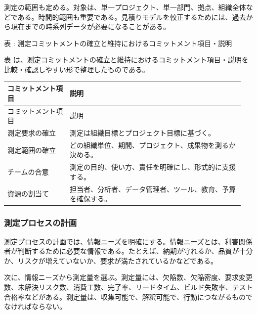 測定の範囲も定める。対象は、単一プロジェクト、単一部門、拠点、組織全体などである。時間的範囲も重要である。見積りモデルを較正するためには、過去から現在までの時系列データが必要になることがある。

\par\smallskip\noindent{}\label{tab:ch09-06}表 \thetable: 測定コミットメントの確立と維持におけるコミットメント項目・説明\par\smallskip
表 \thetable は、測定コミットメントの確立と維持におけるコミットメント項目・説明を比較・確認しやすい形で整理したものである。\par\smallskip
\begin{longtable}{>{\raggedright\arraybackslash}p{0.25\linewidth}>{\raggedright\arraybackslash}p{0.70\linewidth}}
\toprule
コミットメント項目 & 説明 \\
\midrule
\endfirsthead
\toprule
コミットメント項目 & 説明 \\
\midrule
\endhead
測定要求の確立 & 測定は組織目標とプロジェクト目標に基づく。 \\
測定範囲の確立 & どの組織単位、期間、プロジェクト、成果物を測るか決める。 \\
チームの合意 & 測定の目的、使い方、責任を明確にし、形式的に支援する。 \\
資源の割当て & 担当者、分析者、データ管理者、ツール、教育、予算を確保する。 \\
\bottomrule
\end{longtable}

\subsubsection{測定プロセスの計画}
測定プロセスの計画では、情報ニーズを明確にする。情報ニーズとは、利害関係者が判断するために必要な情報である。たとえば、納期が守れるか、品質が十分か、リスクが増えていないか、要求が満たされているかなどである。

次に、情報ニーズから測定量を選ぶ。測定量には、欠陥数、欠陥密度、要求変更数、未解決リスク数、消費工数、完了率、リードタイム、ビルド失敗率、テスト合格率などがある。測定量は、収集可能で、解釈可能で、行動につながるものでなければならない。

